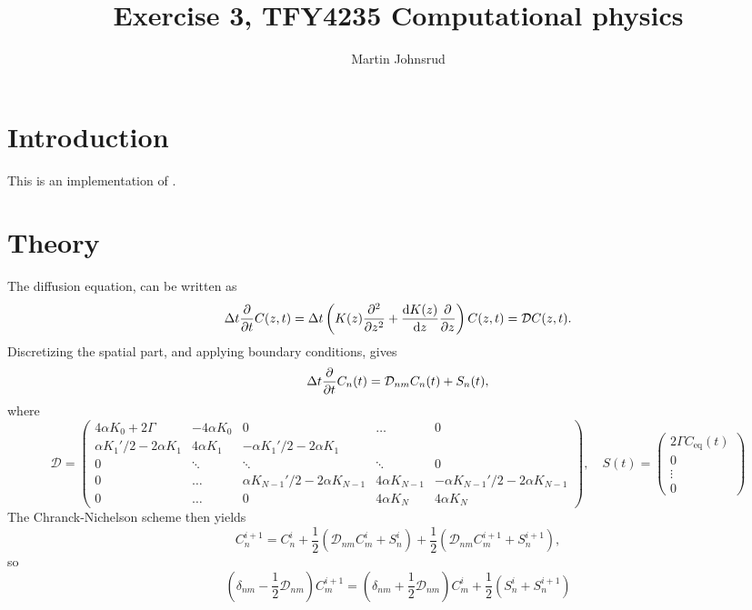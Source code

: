 \documentclass{article}
\title{Exercise 3, TFY4235 Computational physics}
\author{Martin Johnsrud}
\date{}
\begin{document}
    \maketitle
    \section*{Introduction}
        This is an implementation of \cite{exercise}.
    \section*{Theory}
    The diffusion equation, can be written as
    \begin{equation*}
        \Delta t \pdv{t} C(z, t) = \Delta t \left(K(z) \pdv[2]{z} + \dv{K(z)}{z}\pdv{z}\right) C(z, t) = \mathcal{D} C(z, t).
    \end{equation*}
    Discretizing the spatial part, and applying boundary conditions, gives
    \begin{equation*}
        \Delta t \pdv{t} C_n(t) = \mathcal{D}_{nm} C_n(t) + S_n(t),
    \end{equation*}
    where 
    \begin{equation*}
        \mathcal{D} =
        \begin{pmatrix}
            4\alpha K_0 + 2\Gamma & - 4\alpha K_0 & 0 & \dots&0 \\
            \alpha K_1'/2 - 2\alpha K_1 & 4 \alpha K_1 & - \alpha K_1'/2 - 2\alpha K_1 \\
            0 & \ddots & \ddots & \ddots & 0\\
            0 & \dots &\alpha K_{N-1}'/2 - 2\alpha K_{N-1} & 4 \alpha K_{N-1} & - \alpha K_{N-1}'/2 - 2\alpha K_{N-1} \\
             0 & \dots & 0 & 4\alpha K_N & 4\alpha K_N
        \end{pmatrix},\quad
        S(t) = 
        \begin{pmatrix}
            2\Gamma C_\mathrm{eq}(t) \\
            0\\
            \vdots \\
            0
        \end{pmatrix}
    \end{equation*}
    The Chranck-Nichelson scheme then yields
    \begin{equation*}
        C_n^{i+1}  = C_n^i + \frac{1}{2} (\mathcal{D}_{nm} C_m^i + S_n^i) + \frac{1}{2} (\mathcal{D}_{nm} C_m^{i+1} + S_n^{i+1}),
    \end{equation*}
    so 
    \begin{equation*}
        \left(\delta_{nm} - \frac{1}{2} \mathcal{D}_{nm}\right) C_{m}^{i+1} = \left(\delta_{nm} + \frac{1}{2} \mathcal{D}_{nm}\right) C_m^i + \frac{1}{2}(S_n^i + S_n^{i+1})
    \end{equation*}
    
    
\end{document}

